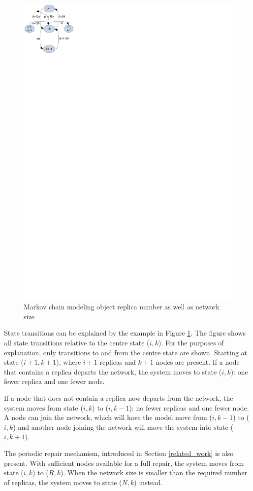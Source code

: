 \documentclass[10pt,a4paper,conference]{IEEEtran}
\begin{document}
\begin{figure}[htbp]
 \centering
 \includegraphics[clip=true, viewport=0.0cm 24.5cm 5.0cm 30cm, width=0.6\columnwidth]{Markov_example}
 \caption{Markov chain modeling object replica number as well as network size}
 \label{fig_markov_example}
\end{figure}

State transitions can be explained by the example in Figure \ref{fig_markov_example}. The figure shows all state transitions relative to the centre state ($i,k$). For the purposes of explanation, only transitions to and from the centre state are shown. Starting at state ($i+1,k+1$), where $i+1$ replicas and $k+1$ nodes are present. If a node that contains a replica departs the network, the system moves to state ($i,k$): one fewer replica and one fewer node.

If a node that does not contain a replica now departs from the network, the system moves from state ($i,k$) to ($i,k-1$): no fewer replicas and one fewer node. A node can join the network, which will have the model move from ($i,k-1$) to ($i,k$) and another node joining the network will move the system into state ($i,k+1$).

The periodic repair mechanism, introduced in Section \ref{related_work} is also present. With sufficient nodes available for a full repair, the system moves from state ($i,k$) to ($R,k$). When the network size is smaller than the required number of replicas, the system moves to state ($N,k$) instead.
\end{document}
